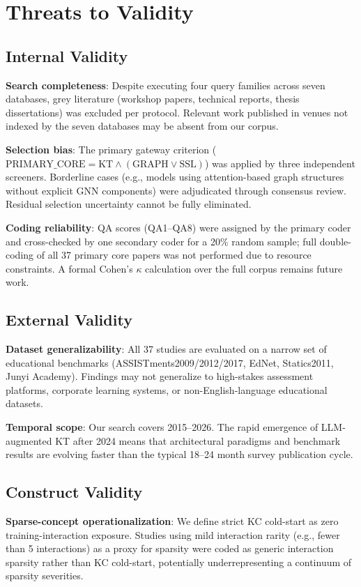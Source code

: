 \documentclass[10pt,journal,compsoc]{IEEEtran}
\begin{document}
\section{Threats to Validity}

\subsection{Internal Validity}
\textbf{Search completeness}: Despite executing four query families across seven databases, grey literature (workshop papers, technical reports, thesis dissertations) was excluded per protocol. Relevant work published in venues not indexed by the seven databases may be absent from our corpus.

\textbf{Selection bias}: The primary gateway criterion ($\text{PRIMARY\_CORE} = \text{KT} \land (\text{GRAPH} \lor \text{SSL})$) was applied by three independent screeners. Borderline cases (e.g., models using attention-based graph structures without explicit GNN components) were adjudicated through consensus review. Residual selection uncertainty cannot be fully eliminated.

\textbf{Coding reliability}: QA scores (QA1--QA8) were assigned by the primary coder and cross-checked by one secondary coder for a 20\% random sample; full double-coding of all 37 primary core papers was not performed due to resource constraints. A formal Cohen's $\kappa$ calculation over the full corpus remains future work.

\subsection{External Validity}
\textbf{Dataset generalizability}: All 37 studies are evaluated on a narrow set of educational benchmarks (ASSISTments2009/2012/2017, EdNet, Statics2011, Junyi Academy). Findings may not generalize to high-stakes assessment platforms, corporate learning systems, or non-English-language educational datasets.

\textbf{Temporal scope}: Our search covers 2015--2026. The rapid emergence of LLM-augmented KT after 2024 means that architectural paradigms and benchmark results are evolving faster than the typical 18--24 month survey publication cycle.

\subsection{Construct Validity}
\textbf{Sparse-concept operationalization}: We define strict KC cold-start as zero training-interaction exposure. Studies using mild interaction rarity (e.g., fewer than 5 interactions) as a proxy for sparsity were coded as generic interaction sparsity rather than KC cold-start, potentially underrepresenting a continuum of sparsity severities.
\end{document}
